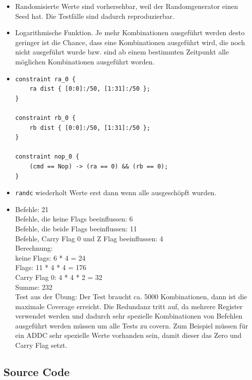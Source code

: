 \documentclass[12pt,a4paper]{article}
\begin{document}
\begin{itemize}
	\item Randomisierte Werte sind vorhersehbar, weil der Randomgenerator einen Seed hat. Die Testfälle sind dadurch reproduzierbar.
	\item Logarithmische Funktion. Je mehr Kombinationen ausgeführt werden desto geringer ist die Chance, dass eine Kombinationen ausgeführt wird, die noch nicht ausgeführt wurde bzw. sind ab einem bestimmten Zeitpunkt alle möglichen Kombinationen ausgeführt worden.
	\item
				\begin{lstlisting}[numbers=none]
constraint ra_0 {
	ra dist { [0:0]:/50, [1:31]:/50 };
}
	
constraint rb_0 {
	rb dist { [0:0]:/50, [1:31]:/50 };
}

constraint nop_0 {
	(cmd == Nop) -> (ra == 0) && (rb == 0);
}
				\end{lstlisting}
		
	\item \texttt{randc} wiederholt Werte erst dann wenn alle ausgeschöpft wurden.
	\item Befehle: 21\\
				Befehle, die keine Flags beeinflussen: 6\\
				Befehle, die beide Flags beeinflussen: 11\\
				Befehle, Carry Flag 0 und Z Flag beeinflussen: 4\\
				
				Berechnung:\\
				keine Flags: 6 * 4 = 24 \\
				Flags: 11 * 4 * 4 = 176 \\
				Carry Flag 0: 4 * 4 * 2 = 32 \\
				Summe: 232 \\
				
				Test aus der Übung: Der Test braucht ca. 5000 Kombinationen, dann ist die maximale Coverage erreicht. Die Redundanz tritt auf, da mehrere Register verwendet werden und dadurch sehr spezielle Kombinationen von Befehlen ausgeführt werden müssen um alle Tests zu covern. Zum Beispiel müssen für ein ADDC sehr spezielle Werte vorhanden sein, damit dieser das Zero und Carry Flag setzt.
				
				
\end{itemize}

\newpage
\subsection{Source Code}
\end{document}
